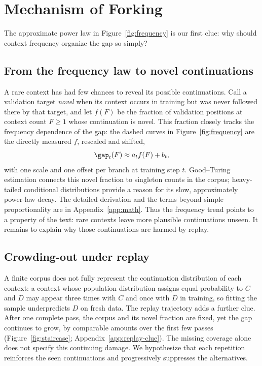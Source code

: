 \section{Mechanism of Forking}
\label{sec:mechanism}

The approximate power law in Figure~\ref{fig:frequency} is our first clue: why should context frequency organize the gap so simply?

\subsection{From the frequency law to novel continuations}
\label{sec:coverage}
A rare context has had few chances to reveal its possible continuations. Call a validation target \emph{novel} when its context occurs in training but was never followed there by that target, and let $f(F)$ be the fraction of validation positions at context count $F\ge1$ whose continuation is novel. This fraction closely tracks the frequency dependence of the gap: the dashed curves in Figure~\ref{fig:frequency} are the directly measured $f$, rescaled and shifted,
\begin{equation}
\gap_t(F)\approx a_t f(F)+b_t,
\label{eq:coverage-main}
\end{equation}
with one scale and one offset per branch at training step $t$. Good--Turing estimation connects this novel fraction to singleton counts in the corpus; heavy-tailed conditional distributions provide a reason for its slow, approximately power-law decay. The detailed derivation and the terms beyond simple proportionality are in Appendix~\ref{app:math}. Thus the frequency trend points to a property of the text: rare contexts leave more plausible continuations unseen. It remains to explain why those continuations are harmed by replay.

\subsection{Crowding-out under replay}
\label{sec:sharpening}
A finite corpus does not fully represent the continuation distribution of each context: a context whose population distribution assigns equal probability to $C$ and $D$ may appear three times with $C$ and once with $D$ in training, so fitting the sample underpredicts $D$ on fresh data. The replay trajectory adds a further clue. After one complete pass, the corpus and its novel fraction are fixed, yet the gap continues to grow, by comparable amounts over the first few passes (Figure~\ref{fig:staircase}; Appendix~\ref{app:replay-clue}). The missing coverage alone does not specify this continuing damage. We hypothesize that each repetition reinforces the seen continuations and progressively suppresses the alternatives.

